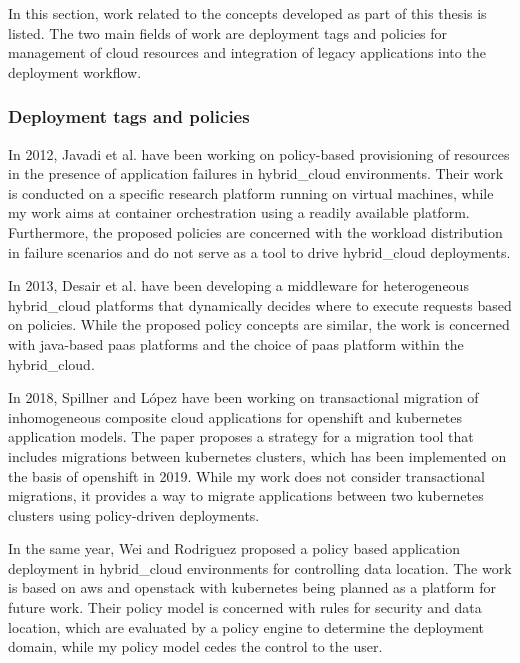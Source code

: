 \documentclass[../main.tex]{subfiles}
\begin{document}
    In this section, work related to the concepts developed as part of this thesis is listed.
    The two main fields of work are deployment tags and policies for management of \gls{cloud} resources and integration of legacy applications into the deployment workflow.

    \subsubsection{Deployment tags and policies}

    In 2012, Javadi et al.
    have been working on policy-based provisioning of resources in the presence of application failures in \gls{hybrid_cloud} environments.
    Their work is conducted on a specific research platform running on virtual machines, while my work aims at container orchestration using a readily available platform.
    Furthermore, the proposed policies are concerned with the workload distribution in failure scenarios and do not serve as a tool to drive \gls{hybrid_cloud} deployments.\cite{rc_prov_policy_failures}

    In 2013, Desair et al.
    have been developing a middleware for heterogeneous \gls{hybrid_cloud} platforms that dynamically decides where to execute requests based on policies.
    While the proposed policy concepts are similar, the work is concerned with \gls{java}-based \acrshort{paas} platforms and the choice of \acrshort{paas} platform within the \gls{hybrid_cloud}.\cite{policy_driven_hc_mw}

    In 2018, Spillner and López have been working on transactional migration of inhomogeneous composite \gls{cloud} applications for \gls{openshift} and \gls{kubernetes} application models.
    The paper proposes a strategy for a migration tool that includes migrations between \gls{kubernetes} clusters, which has been implemented on the basis of \gls{openshift} in 2019.
    While my work does not consider transactional migrations, it provides a way to migrate applications between two \gls{kubernetes} clusters using policy-driven deployments.\cite{rw_migr_cloud_apps,openshifter}

    In the same year, Wei and Rodriguez proposed a policy based application deployment in \gls{hybrid_cloud} environments for controlling data location.
    The work is based on \acrshort{aws} and \gls{openstack} with \gls{kubernetes} being planned as a platform for future work.
    Their policy model is concerned with rules for security and data location, which are evaluated by a policy engine to determine the deployment domain, while my policy model cedes the control to the user.\cite{policy_hc_deploy}
\end{document}
